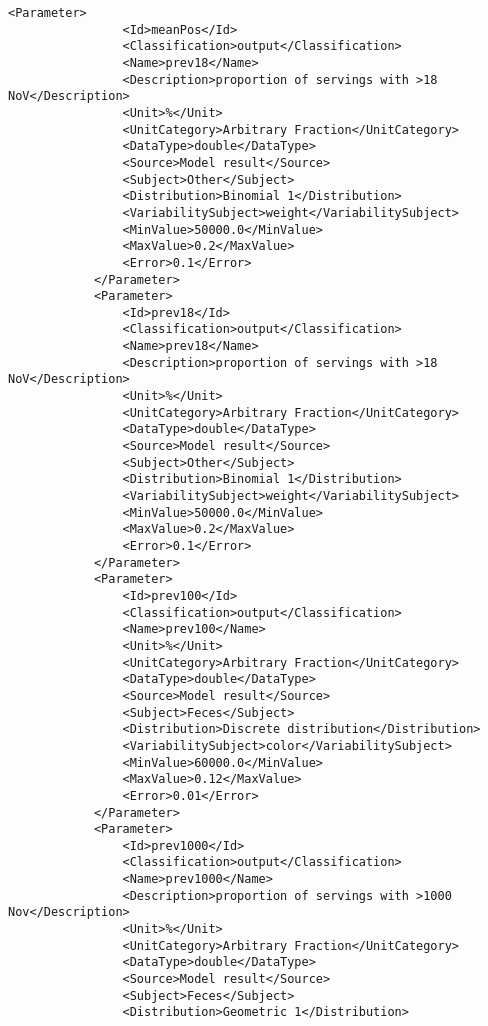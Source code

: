\begin{lstlisting}[language=RAKIP, caption={Example of DoseResponseModel}]
            <Parameter>
                <Id>meanPos</Id>
                <Classification>output</Classification>
                <Name>prev18</Name>
                <Description>proportion of servings with >18 NoV</Description>
                <Unit>%</Unit>
                <UnitCategory>Arbitrary Fraction</UnitCategory>
                <DataType>double</DataType>
                <Source>Model result</Source>
                <Subject>Other</Subject>
                <Distribution>Binomial 1</Distribution>
                <VariabilitySubject>weight</VariabilitySubject>
                <MinValue>50000.0</MinValue>
                <MaxValue>0.2</MaxValue>
                <Error>0.1</Error>
            </Parameter>
            <Parameter>
                <Id>prev18</Id>
                <Classification>output</Classification>
                <Name>prev18</Name>
                <Description>proportion of servings with >18 NoV</Description>
                <Unit>%</Unit>
                <UnitCategory>Arbitrary Fraction</UnitCategory>
                <DataType>double</DataType>
                <Source>Model result</Source>
                <Subject>Other</Subject>
                <Distribution>Binomial 1</Distribution>
                <VariabilitySubject>weight</VariabilitySubject>
                <MinValue>50000.0</MinValue>
                <MaxValue>0.2</MaxValue>
                <Error>0.1</Error>
            </Parameter>
            <Parameter>
                <Id>prev100</Id>
                <Classification>output</Classification>
                <Name>prev100</Name>
                <Unit>%</Unit>
                <UnitCategory>Arbitrary Fraction</UnitCategory>
                <DataType>double</DataType>
                <Source>Model result</Source>
                <Subject>Feces</Subject>
                <Distribution>Discrete distribution</Distribution>
                <VariabilitySubject>color</VariabilitySubject>
                <MinValue>60000.0</MinValue>
                <MaxValue>0.12</MaxValue>
                <Error>0.01</Error>
            </Parameter>
            <Parameter>
                <Id>prev1000</Id>
                <Classification>output</Classification>
                <Name>prev1000</Name>
                <Description>proportion of servings with >1000 Nov</Description>
                <Unit>%</Unit>
                <UnitCategory>Arbitrary Fraction</UnitCategory>
                <DataType>double</DataType>
                <Source>Model result</Source>
                <Subject>Feces</Subject>
                <Distribution>Geometric 1</Distribution>

\end{lstlisting}
